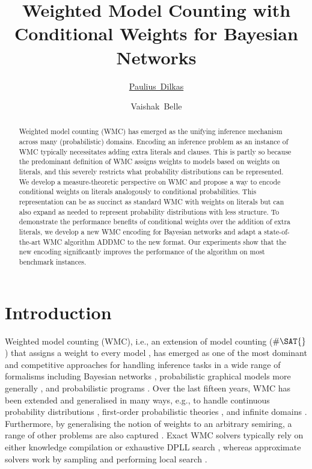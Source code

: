 \documentclass[accepted]{uai2021}
\title{Weighted Model Counting with Conditional Weights for Bayesian Networks}
\author[1]{\href{mailto:Paulius Dilkas <p.dilkas@sms.ed.ac.uk>?Subject=Your UAI
    2021 paper}{Paulius~Dilkas}{}}
\author[1,2]{Vaishak~Belle}
\affil[1]{%
    School of Informatics\\
    University of Edinburgh\\
    Edinburgh, UK
}
\affil[2]{%
    Alan Turing Institute\\
    London, UK
}
\theoremstyle{definition}
\begin{document}
\maketitle

\begin{abstract}
  Weighted model counting (WMC) has emerged as the unifying inference mechanism
  across many (probabilistic) domains. Encoding an inference problem as an
  instance of WMC typically necessitates adding extra literals and clauses. This
  is partly so because the predominant definition of WMC assigns weights to
  models based on weights on literals, and this severely restricts what
  probability distributions can be represented. We develop a measure-theoretic
  perspective on WMC and propose a way to encode conditional weights on literals
  analogously to conditional probabilities. This representation can be as
  succinct as standard WMC with weights on literals but can also expand as
  needed to represent probability distributions with less structure. To
  demonstrate the performance benefits of conditional weights over the addition
  of extra literals, we develop a new WMC encoding for Bayesian networks and
  adapt a state-of-the-art WMC algorithm \textsf{ADDMC} to the new format. Our
  experiments show that the new encoding significantly improves the performance
  of the algorithm on most benchmark instances.
\end{abstract}

\section{Introduction}

Weighted model counting (WMC), i.e., an extension of model counting ($\#\SAT{}$)
that assigns a weight to every model \citep{DBLP:conf/aaai/SangBK05}, has
emerged as one of the most dominant and competitive approaches for handling
inference tasks in a wide range of formalisms including Bayesian networks
\citep{DBLP:conf/aaai/SangBK05,DBLP:books/daglib/0024906}, probabilistic
graphical models more generally \citep{DBLP:conf/ecsqaru/ChoiKD13}, and
probabilistic programs
\citep{DBLP:journals/tplp/FierensBRSGTJR15,DBLP:journals/corr/abs-2005-09089}.
Over the last fifteen years, WMC has been extended and generalised in many ways,
e.g., to handle continuous probability distributions
\citep{DBLP:conf/ijcai/BellePB15}, first-order probabilistic theories
\citep{DBLP:conf/ijcai/BroeckTMDR11,DBLP:journals/cacm/GogateD16}, and infinite
domains \citep{DBLP:conf/aaai/Belle17}. Furthermore, by generalising the notion
of weights to an arbitrary semiring, a range of other problems are also captured
\citep{DBLP:journals/japll/KimmigBR17}. Exact WMC solvers typically rely on
either knowledge compilation
\citep{DBLP:conf/ijcai/OztokD15,DBLP:conf/ijcai/LagniezM17} or exhaustive DPLL
search \citep{DBLP:conf/aaai/SangBK05}, whereas approximate solvers work by
sampling \citep{DBLP:conf/aaai/ChakrabortyFMSV14} and performing local search
\citep{DBLP:conf/sat/WeiS05}.
\end{document}
